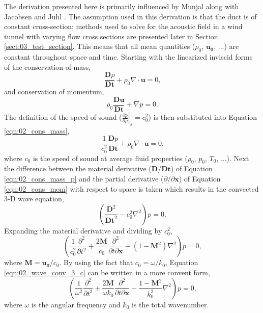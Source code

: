 The derivation presented here is primarily influenced by Munjal \cite{Munjal-2014-w28y4EyP} along with Jacobsen and Juhl \cite{Jacobsen-2013-PHD3v3YZ}.
The assumption used in this derivation is that the duct is of constant cross-section;
methods used to solve for the acoustic field in a wind tunnel with varying flow cross sections are presented later in Section \ref{sect:03_test_section}.
This means that all mean quantities ($\rho_0$, $\mathbf{u_0}$, ...) are constant throughout space and time.
Starting with the linearized inviscid forms of the conservation of mass,
\begin{equation}
  \frac{\mathbf{D}\rho}{\mathbf{Dt}} + \rho_0\nabla\cdot\mathbf{u} = 0 \textrm{,}
  \label{eqn:02_cons_mass}
\end{equation}
and conservation of momentum,
\begin{equation}
  \rho_0\frac{\mathbf{Du}}{\mathbf{Dt}} + \nabla p = 0 \textrm{.}
  \label{eqn:02_cons_mom}
\end{equation}
The definition of the speed of sound ($\left.\frac{\partial p}{\partial\rho}\right|_s = c_0^2$) is then substituted into Equation \ref{eqn:02_cons_mass},
\begin{equation}
  \frac{1}{c_0^2}\frac{\mathbf{D}p}{\mathbf{Dt}} + \rho_0\nabla\cdot\mathbf{u} = 0 \textrm{,}
  \label{eqn:02_cons_mass_p}
\end{equation}
where $c_0$ is the speed of sound at average fluid properties ($\rho_0$, $p_0$, $T_0$, ...).
Next the difference between the material derivative ($\mathbf{D}/\mathbf{Dt}$) of Equation \ref{eqn:02_cons_mass_p} and the partial derivative ($\partial/\partial\mathbf{x}$) of Equation \ref{eqn:02_cons_mom} with respect to space is taken which results in the convected 3-D wave equation,
\begin{equation}
  \left(\frac{\mathbf{D}^2}{\mathbf{Dt}^2}-c_0^2\nabla^2\right)p=0\textrm{.}
  \label{eqn:02_wave_conv_3_c}
\end{equation}
Expanding the material derivative and dividing by $c_0^2$,
\begin{equation}
  \left(\frac{1}{c_0^2}\frac{\partial^2}{\partial t^2} + \frac{2\mathbf{M}}{c_0}\frac{\partial^2}{\partial t\partial\mathbf{x}} - (1-\mathbf{M}^2)\nabla^2\right)p = 0 \textrm{,}
  \label{eqn:02_wave_conv_expand}
\end{equation}
where $\mathbf{M} = \mathbf{u_0}/c_0$.
By using the fact that $c_0=\omega/k_0$, Equation \ref{eqn:02_wave_conv_3_c} can be written in a more convent form,
\begin{equation}
  \left(\frac{1}{\omega^2}\frac{\partial^2}{\partial t^2} + \frac{2\mathbf{M}}{\omega k_0}\frac{\partial^2}{\partial t\partial\mathbf{x}} - \frac{1-\mathbf{M}^2}{k_0^2}\nabla^2\right)p = 0 \textrm{,}
  \label{eqn:02_wave_conv_3}
\end{equation}
where $\omega$ is the angular frequency and $k_0$ is the total wavenumber.

